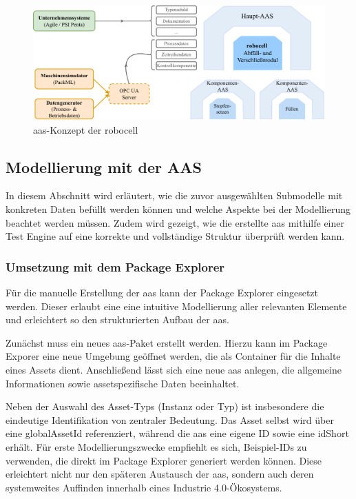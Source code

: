 \begin{figure}[htbp]
    \centering
    \includegraphics[width=1\textwidth]{Bilder/Konzeptionierung/konzeptionierung.pdf}
    \caption{\acs{aas}-Konzept der robocell}
    \label{fig:konzeptionierungAAS}
\end{figure}

\subsection{Modellierung mit der AAS}
In diesem Abschnitt wird erläutert, wie die zuvor ausgewählten Submodelle mit konkreten Daten befüllt werden können und welche Aspekte bei der Modellierung beachtet werden müssen.
Zudem wird gezeigt, wie die erstellte \acs{aas} mithilfe einer Test Engine auf eine korrekte und vollständige Struktur überprüft werden kann. 
\subsubsection{Umsetzung mit dem Package Explorer}
Für die manuelle Erstellung der \acs{aas} kann der Package Explorer eingesetzt werden.
Dieser erlaubt eine eine intuitive Modellierung aller relevanten Elemente und erleichtert so den strukturierten Aufbau der \acs{aas}.

Zunächst muss ein neues \acs{aas}-Paket erstellt werden.
Hierzu kann im Package Exporer eine neue Umgebung geöffnet werden, die als Container für die Inhalte eines Assets dient.
Anschließend lässt sich eine neue \acs{aas} anlegen, die allgemeine Informationen sowie assetspezifische Daten beeinhaltet.

Neben der Auswahl des Asset-Typs (Instanz oder Typ) ist insbesondere die eindeutige Identifikation von zentraler Bedeutung.
Das Asset selbst wird über eine globalAssetId referenziert, während die \acs{aas} eine eigene ID sowie eine idShort erhält.
Für erste Modellierungszwecke empfiehlt es sich, Beispiel-IDs zu verwenden, die direkt im Package Explorer generiert werden können.
Diese erleichtert nicht nur den späteren Austausch der \acs{aas}, sondern auch deren systemweites Auffinden innerhalb eines Industrie 4.0-Ökosystems.

